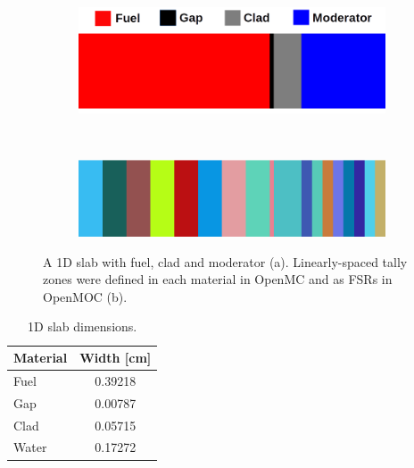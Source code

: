 \begin{figure}[h!]
\begin{subfigure}{\textwidth}
  \centering
  \includegraphics[width=0.7\linewidth]{figures/biases/slab/slab-simple-labels}
  \caption{}
\end{subfigure} \\
\begin{subfigure}{\textwidth}
  \centering
  \includegraphics[width=0.7\linewidth]{figures/biases/slab/slab-8x}
  \caption{}
\end{subfigure}
\caption[1D slab materials and geometry]{A 1D slab with fuel, clad and moderator (a). Linearly-spaced tally zones were defined in each material in OpenMC and as \ac{FSR}s in OpenMOC (b).}
\label{fig:chap4-slab}
\end{figure}

\begin{table}[h!]
  \centering
  \caption[1D slab dimensions]{1D slab dimensions.}
  \small
  \label{table:chap4-slab-widths} 
  \vspace{6pt}
  \begin{tabular}{l c}
  \toprule
  \multicolumn{1}{c}{\bf Material} &
  \multicolumn{1}{c}{\bf Width [cm]} \\
  \midrule
  Fuel &  0.39218 \\
  Gap &   0.00787 \\
  Clad &  0.05715 \\
  Water & 0.17272 \\
  \bottomrule
\end{tabular}
\end{table}

